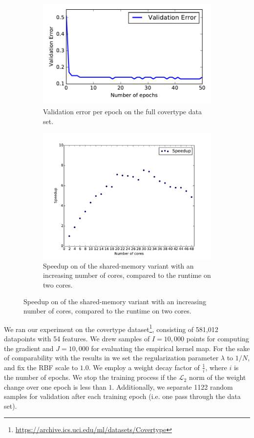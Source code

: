 \documentclass{article} %
\begin{document}
\begin{figure}[!ht]
	\begin{subfigure}[b]{0.4\textwidth}
		\centering
		\includegraphics[width=\textwidth]{imgs/covertype_validation.pdf}
		\caption{Validation error per epoch on the full covertype data set.}
		\label{fig:covertype_validation}
	\end{subfigure}
  \hfill
	\begin{subfigure}[b]{0.4\textwidth}
		\centering
		\includegraphics[width=\textwidth]{imgs/speedup_58.pdf}
		\caption{Speedup on of the shared-memory variant with an increasing number of cores, compared to the runtime on two cores.}
		\label{fig:speedup_58}
	\end{subfigure}
\end{figure}

We ran our experiment on the covertype dataset\footnote{\url{https://archive.ics.uci.edu/ml/datasets/Covertype}}, consisting of 581,012 datapoints with 54 features. We drew samples of $I=10,000$ points for computing the gradient and $J=10,000$ for evaluating the empirical kernel map. For the sake of comparability with the results in \cite{Dai2014} we set the regularization parameter $\lambda$ to $1 / N$, and fix the RBF scale to $1.0$. We employ a weight decay factor of $\frac{1}{i}$, where $i$ is the number of epochs. We stop the training process if the $\mathcal{L}_{2}$ norm of the weight change over one epoch is less than $1$. Additionally, we separate 1122 random samples for validation after each training epoch (i.e. one pass through the data set).
\end{document}
